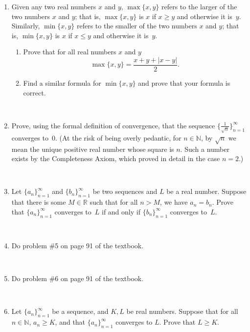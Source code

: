 \documentclass{amsart}
\def\R{\mathbb R}
\def\N{\mathbb N}
\begin{document}
\begin{enumerate}




\item 
Given any two real numbers $x$ and $y$, $\max \{x, y\}$ refers to the larger of the two numbers $x$ and
$y$; that is, $\max \{x,y\}$ is $x$ if $x \geq y$ and otherwise it is~$y$.
Similarly, $\min \{x, y\}$ refers to the smaller of the two numbers $x$ and
$y$; that is, $\min\{x,y\}$ is $x$ if $x \leq y$ and otherwise it is~$y$.


\begin{enumerate}
	
	\item
	Prove that for all real numbers $x$ and $y$
	$$
	\max \{x,y\} = \frac{x+y + |x-y|}{2}.
	$$
	
	\item Find a similar formula for $\min \{x,y\}$ and prove that your
	formula is correct.
	
\end{enumerate}

\

 \item Prove, using the formal definition of convergence, that the sequence $\{\frac{1}{\sqrt{n}}\}_{n=1}^\infty$ converges to~$0$. 
(At the risk of being overly pedantic, for $n \in \N$, by $\sqrt{n}$
we mean the unique positive real number whose square is $n$. Such a number exists by the Completeness Axiom, which proved in detail in the case $n = 2$.)

\

\item Let $\{a_n\}_{n=1}^\infty$ and $\{b_n\}_{n=1}^\infty$ be two sequences and $L$ be a real number. Suppose that there is some $M\in \R$ such that for all $n>M$, we have $a_n=b_n$. Prove that $\{a_n\}_{n=1}^\infty$ converges to~$L$ if and only if $\{b_n\}_{n=1}^\infty$ converges to~$L$.

\

\item Do problem \#5 on page 91 of the textbook.

\

\item Do problem \#6 on page 91 of the textbook.

\

\item Let $\{a_n\}_{n=1}^\infty$ be a sequence, and $K,L$ be real numbers. Suppose that for all $n\in \N$, $a_n\geq K$, and that $\{a_n\}_{n=1}^\infty$ converges to $L$. Prove that $L\geq K$. 

\



\end{enumerate}
\end{document}
